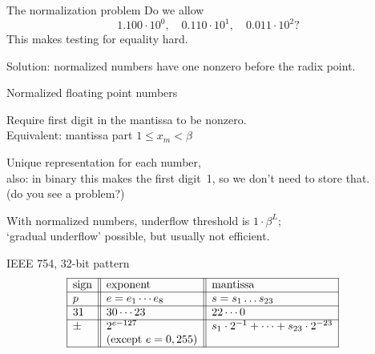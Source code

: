 \begin{numberedframe}{The normalization problem}
  Do we allow
  \[ 1.100\cdot 10^{0},\quad 0.110\cdot 10^1,\quad 0.011\cdot
  10^{2}? \]
  This makes testing for equality hard.

  Solution: normalized numbers have one nonzero before the radix point.
\end{numberedframe}

\begin{numberedframe}{Normalized floating point numbers}

Require first digit in the mantissa to be nonzero.\\
Equivalent: mantissa part $1\leq x_m<\beta$

Unique representation for each number,\\
also: in binary this makes the first digit~1, so we don't need to
store that.\\
(do you see a problem?)

With normalized numbers, underflow threshold is
$1\cdot\beta^L$;\\
`gradual underflow' possible, but usually not efficient.
\end{numberedframe}

\begin{numberedframe}{IEEE 754, 32-bit pattern}
\small
  \[
  \begin{array}{| l || l || l |}
    \hline
    \hbox{sign}&\hbox{exponent}&\hbox{mantissa}\\
    \hline
    p&e=e_1\cdots e_8 &s=s_1\dots s_{23}\\
    \hline
    31&30\cdots 23&22\cdots 0\\
    \hline
    \pm & 2^{e-127} & s_1\cdot 2^{-1}+\cdots + s_{23}\cdot 2^{-23} \\
    & \hbox{(except $e=0,255$)} & \\
    \hline
  \end{array}\quad
  \]
\end{numberedframe}

